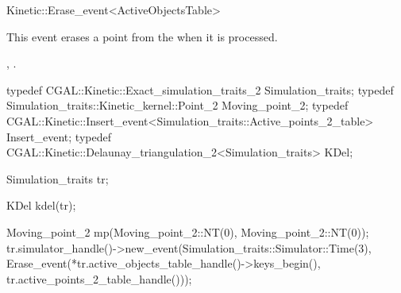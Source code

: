 

\begin{ccRefClass}{Kinetic::Erase_event<ActiveObjectsTable>}  %


\ccDefinition
  
This event erases a point from the  when it
is processed.


\ccIsModel
{}

\ccCreation
{}  %



\ccSeeAlso

,
.

\ccExample

\begin{ccExampleCode}
typedef CGAL::Kinetic::Exact_simulation_traits_2 Simulation_traits;
typedef Simulation_traits::Kinetic_kernel::Point_2 Moving_point_2;
typedef CGAL::Kinetic::Insert_event<Simulation_traits::Active_points_2_table> Insert_event;
typedef CGAL::Kinetic::Delaunay_triangulation_2<Simulation_traits> KDel;

Simulation_traits tr;

KDel kdel(tr);

Moving_point_2 mp(Moving_point_2::NT(0),
                  Moving_point_2::NT(0));
tr.simulator_handle()->new_event(Simulation_traits::Simulator::Time(3), 
                                 Erase_event(*tr.active_objects_table_handle()->keys_begin(),
			                      tr.active_points_2_table_handle()));

\end{ccExampleCode}




\end{ccRefClass}


